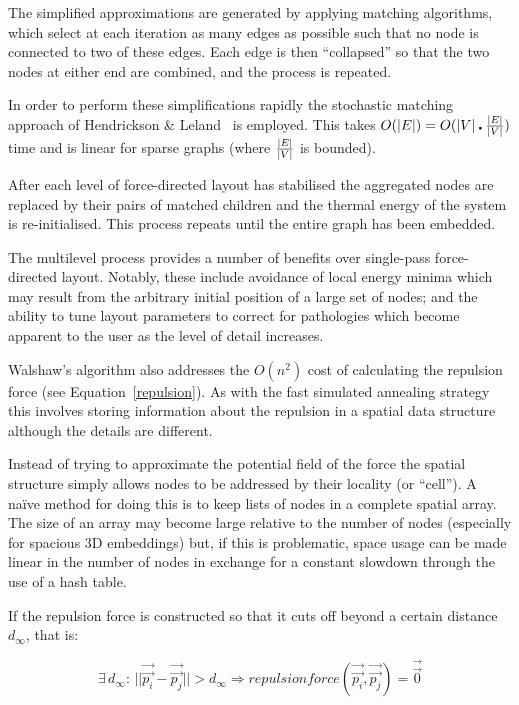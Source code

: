 \documentclass[runningheads]{cl2emult}
\newcommand{\avec}[1]{\vec{\overrightarrow{ #1}}}
\begin{document}
The simplified approximations are generated by applying matching algorithms,
which select at each iteration as many edges as possible such that
no node is connected to two of these edges.  Each edge is then ``collapsed''
so that the two nodes at either end are combined, and the process is repeated.

In order to perform these simplifications rapidly the stochastic matching
approach of Hendrickson \& Leland~\cite{hendrickson95multilevel} is employed.
This takes $O(|E|) = O(|V| \centerdot {|E| \over |V|})$ time and is linear for
sparse graphs (where ${|E| \over |V|}$ is bounded).

After each level of force-directed layout has stabilised the aggregated
nodes are replaced by their pairs of matched children and the thermal energy
of the system is re-initialised.  This process repeats until the entire graph
has been embedded.

The multilevel process provides a number of benefits over single-pass
force-directed layout.  Notably, these include avoidance of local energy minima
which may result from the arbitrary initial position of a large set of nodes;
and the ability to tune layout parameters to correct for pathologies which
become apparent to the user as the level of detail increases.

Walshaw's algorithm also addresses the $O(n^2)$ cost of calculating the
repulsion force (see Equation~\ref{repulsion}).  As with the fast simulated
annealing strategy this involves storing information about the repulsion in
a spatial data structure although the details are different.

Instead of trying to approximate the potential field of the force the
spatial structure simply allows nodes to be addressed by their locality (or
``cell'').  A na\"{i}ve method for doing this is to keep lists of nodes in a
complete spatial array.  The size of an array may become large relative to
the number of nodes (especially for spacious 3D embeddings) but, if this is
problematic, space usage can be made linear in the number of nodes in
exchange for a constant slowdown through the use of a hash table.

If the repulsion force is constructed so that it cuts off beyond a certain
distance $d_\infty$, that is:

\begin{equation}
\exists \, d_\infty : \, 
||\avec{p_i} - \avec{p_j}|| > d_\infty
\Rightarrow 
repulsionforce (\avec{p_i},\avec{p_j}) = \avec{0}
\end{equation}
\end{document}
